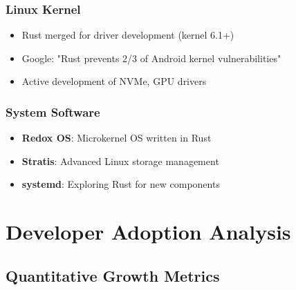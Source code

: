 \documentclass[11pt]{article}
\begin{document}
\subsubsection{Linux Kernel}
\begin{itemize}
    \item Rust merged for driver development (kernel 6.1+)
    \item Google: "Rust prevents 2/3 of Android kernel vulnerabilities"~\cite{google2023kernel}
    \item Active development of NVMe, GPU drivers
\end{itemize}

\subsubsection{System Software}
\begin{itemize}
    \item \textbf{Redox OS}: Microkernel OS written in Rust
    \item \textbf{Stratis}: Advanced Linux storage management
    \item \textbf{systemd}: Exploring Rust for new components
\end{itemize}

\section{Developer Adoption Analysis}

\subsection{Quantitative Growth Metrics}
\end{document}
